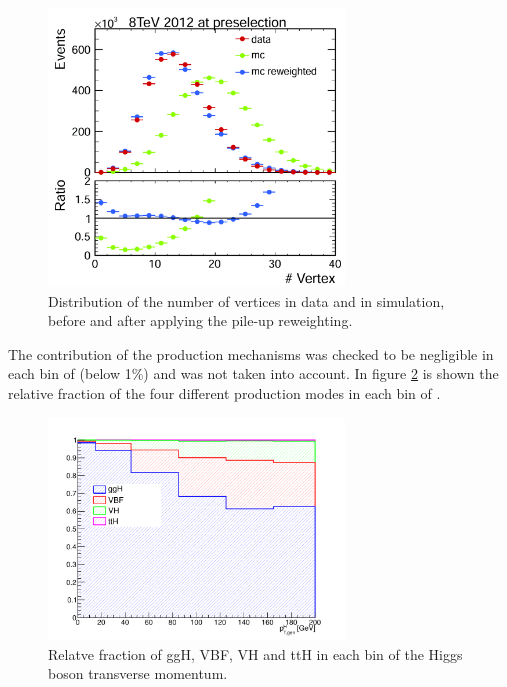 \begin{figure}[htb]
\centering
\includegraphics[width=0.7\textwidth]{images/nvertex.pdf}
\caption{Distribution of the number of vertices in data and in simulation, before and after applying the pile-up reweighting.}\label{fig:nvertex}
\end{figure}


The contribution of the \ttH production mechanisms was checked to be negligible in each bin of \pth (below 1\%) and was not taken into account. In figure \ref{fig:signal_comp} is shown the relative fraction of the four different production modes in each bin of \pth.

\begin{figure}[htb]
\centering
\includegraphics[width=0.7\textwidth]{images/signal_composition_ttH.pdf}
\caption{Relatve fraction of ggH, VBF, VH and ttH in each bin of the Higgs boson transverse momentum.}\label{fig:signal_comp}
\end{figure}
